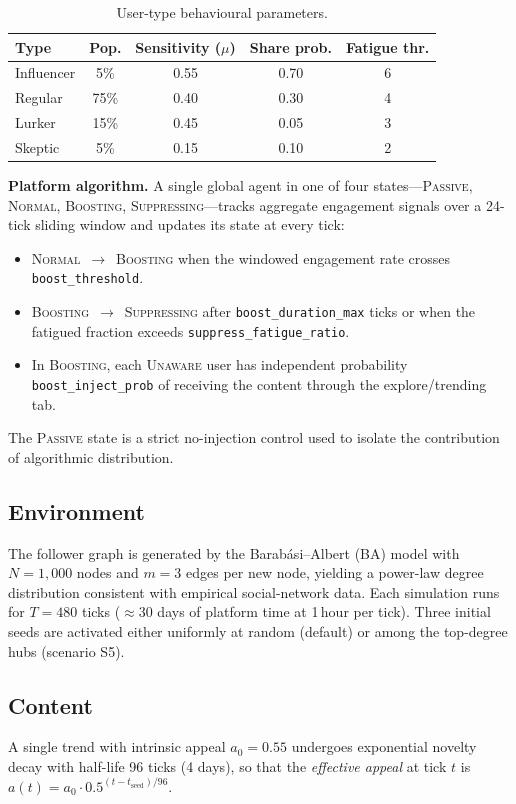 \documentclass[sigconf, nonacm]{acmart}
\begin{document}
\begin{table}[t]
\centering
\caption{User-type behavioural parameters.}
\label{tab:types}
\small
\begin{tabular}{lcccc}
\toprule
Type & Pop. & Sensitivity ($\mu$) & Share prob. & Fatigue thr.\\
\midrule
Influencer & 5\%  & 0.55 & 0.70 & 6 \\
Regular    & 75\% & 0.40 & 0.30 & 4 \\
Lurker     & 15\% & 0.45 & 0.05 & 3 \\
Skeptic    &  5\% & 0.15 & 0.10 & 2 \\
\bottomrule
\end{tabular}
\end{table}

\textbf{Platform algorithm.}
A single global agent in one of four states---\textsc{Passive},
\textsc{Normal}, \textsc{Boosting}, \textsc{Suppressing}---tracks
aggregate engagement signals over a 24-tick sliding window and updates
its state at every tick:
\begin{itemize}
  \item \textsc{Normal}~$\to$~\textsc{Boosting} when the windowed
    engagement rate crosses \texttt{boost\_threshold}.
  \item \textsc{Boosting}~$\to$~\textsc{Suppressing} after
    \texttt{boost\_duration\_max} ticks or when the fatigued fraction
    exceeds \texttt{suppress\_fatigue\_ratio}.
  \item In \textsc{Boosting}, each \textsc{Unaware} user has independent
    probability \texttt{boost\_inject\_prob} of receiving the content
    through the explore/trending tab.
\end{itemize}
The \textsc{Passive} state is a strict no-injection control used to
isolate the contribution of algorithmic distribution.

\subsection{Environment}
The follower graph is generated by the Barab\'{a}si--Albert (BA) model
with $N{=}1{,}000$ nodes and $m{=}3$ edges per new node, yielding a
power-law degree distribution consistent with empirical social-network
data.  Each simulation runs for $T{=}480$ ticks ($\approx{}$30 days of
platform time at 1\,hour per tick).  Three initial seeds are activated
either uniformly at random (default) or among the top-degree hubs
(scenario S5).

\subsection{Content}
A single trend with intrinsic appeal $a_0{=}0.55$ undergoes exponential
novelty decay with half-life 96 ticks (4 days), so that the
\emph{effective appeal} at tick $t$ is
$a(t)=a_0\cdot 0.5^{(t-t_{\mathrm{seed}})/96}$.
\end{document}
